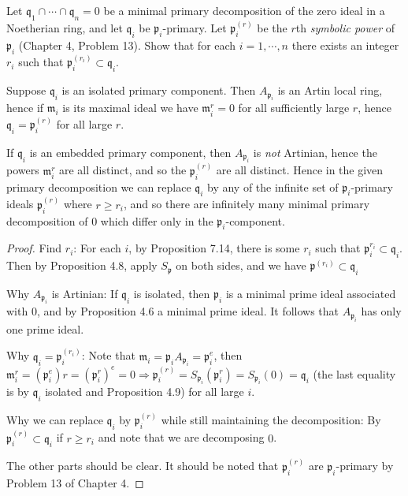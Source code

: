 \documentclass{solution}
\begin{document}
\begin{problem}
    Let $\mathfrak{q}_1 \cap \cdots \cap \mathfrak{q}_n = 0$ be a minimal primary decomposition of the zero ideal in a Noetherian ring, and let $\mathfrak{q}_i$ be $\mathfrak{p}_i$-primary. Let $\mathfrak{p}_i^{(r)}$ be the $r$th \textit{symbolic power} of $\mathfrak{p}_i$ (Chapter 4, Problem 13). Show that for each $i = 1, \cdots, n$ there exists an integer $r_i$ such that $\mathfrak{p}_i^{(r_i)} \subset \mathfrak{q}_i$.

    Suppose $\mathfrak{q}_i$ is an isolated primary component. Then $A_{\mathfrak{p}_i}$ is an Artin local ring, hence if $\mathfrak{m}_i$ is its maximal ideal we have $\mathfrak{m}_i^r = 0$ for all sufficiently large $r$, hence $\mathfrak{q}_i = \mathfrak{p}_i^{(r)}$ for all large $r$.

    If $\mathfrak{q}_i$ is an embedded primary component, then $A_{\mathfrak{p}_i}$ is \textit{not} Artinian, hence the powers $\mathfrak{m}_i^r$ are all distinct, and so the $\mathfrak{p}_i^{(r)}$ are all distinct. Hence in the given primary decomposition we can replace $\mathfrak{q}_i$ by any of the infinite set of $\mathfrak{p}_i$-primary ideals $\mathfrak{p}_i^{(r)}$ where $r \ge r_i$, and so there are infinitely many minimal primary decomposition of $0$ which differ only in the $\mathfrak{p}_i$-component.
\end{problem}

\begin{proof}
    Find $r_i$: For each $i$, by Proposition 7.14, there is some $r_i$ such that $\mathfrak{p}_i^{r_i} \subset \mathfrak{q}_i$. Then by Proposition 4.8, apply $S_{\mathfrak{p}}$ on both sides, and we have $\mathfrak{p}^{(r_i)} \subset \mathfrak{q}_i$

    Why $A_{\mathfrak{p}_i}$ is Artinian: If $\mathfrak{q}_i$ is isolated, then $\mathfrak{p}_i$ is a minimal prime ideal associated with $0$, and by Proposition 4.6 a minimal prime ideal. It follows that $A_{\mathfrak{p}_i}$ has only one prime ideal. 

    Why $\mathfrak{q}_i = \mathfrak{p}_i^{(r_i)}$: Note that $\mathfrak{m}_i = \mathfrak{p}_i A_{\mathfrak{p}_i} = \mathfrak{p}_i^e$, then $\mathfrak{m}_i^r = (\mathfrak{p}_i^e)r = (\mathfrak{p}_i^r)^e = 0 \Rightarrow \mathfrak{p}_i^{(r)} = S_{\mathfrak{p}_i}(\mathfrak{p}_i^r) = S_{\mathfrak{p}_i}(0) = \mathfrak{q}_i$ (the last equality is by $\mathfrak{q}_i$ isolated and Proposition 4.9) for all large $i$.

    Why we can replace $\mathfrak{q}_i$ by $\mathfrak{p}_i^{(r)}$ while still maintaining the decomposition: By $\mathfrak{p}_i^{(r)} \subset \mathfrak{q}_i$ if $r \ge r_i$ and note that we are decomposing $0$.

    The other parts should be clear. It should be noted that $\mathfrak{p}_i^{(r)}$ are $\mathfrak{p}_i$-primary by Problem 13 of Chapter 4.
\end{proof}
\end{document}
